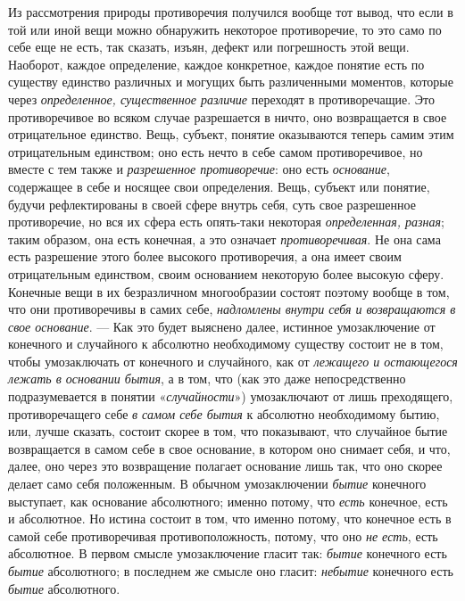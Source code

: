 Из рассмотрения природы противоречия получился вообще тот вывод, что если в
той или иной вещи можно обнаружить некоторое противоречие, то это само по
себе еще не есть, так сказать, изъян, дефект или погрешность этой вещи.
Наоборот, каждое определение, каждое конкретное, каждое понятие есть по
существу единство различных и могущих быть различенными моментов, которые
через {\em определенное, существенное различие}
переходят в противоречащие. Это противоречивое во всяком случае разрешается
в ничто, оно возвращается в свое отрицательное единство. Вещь, субъект,
понятие оказываются теперь самим этим отрицательным единством; оно есть
нечто в себе самом противоречивое, но вместе с тем также и
{\em разрешенное противоречие}: оно есть
{\em основание}, содержащее в себе и носящее свои
определения. Вещь, субъект или понятие, будучи рефлектированы в своей сфере
внутрь себя, суть свое разрешенное противоречие, но вся их сфера есть
опять-таки некоторая {\em определенная, разная}; таким
образом, она есть конечная, а это означает
{\em противоречивая}. Не она сама есть разрешение этого
более высокого противоречия, а она имеет своим отрицательным единством,
своим основанием некоторую более высокую сферу. Конечные вещи в их
безразличном многообразии состоят поэтому вообще в том, что они
противоречивы в самих себе, {\em надломлены внутри себя
и возвращаются в свое основание}. — Как это будет выяснено далее, истинное
умозаключение от конечного и случайного к абсолютно необходимому существу
состоит не в том, чтобы умозаключать от конечного и случайного, как от
{\em лежащего и остающегося лежать в основании бытия},
а в том, что (как это даже непосредственно подразумевается в понятии
«{\em случайности}») умозаключают от лишь преходящего,
противоречащего себе {\em в самом себе бытия} к
абсолютно необходимому бытию, или, лучше сказать, состоит скорее в том, что
показывают, что случайное бытие возвращается в самом себе в свое основание,
в котором оно снимает себя, и что, далее, оно через это возвращение
полагает основание лишь так, что оно скорее делает само себя положенным. В
обычном умозаключении {\em бытие} конечного выступает,
как основание абсолютного; именно потому, что
{\em есть} конечное, есть и абсолютное. Но истина
состоит в том, что именно потому, что конечное есть в самой себе
противоречивая противоположность, потому, что оно
{\em не есть}, есть абсолютное. В первом смысле
умозаключение гласит так: {\em бытие} конечного есть
{\em бытие} абсолютного; в последнем же смысле оно
гласит: {\em небытие} конечного есть
{\em бытие} абсолютного.
